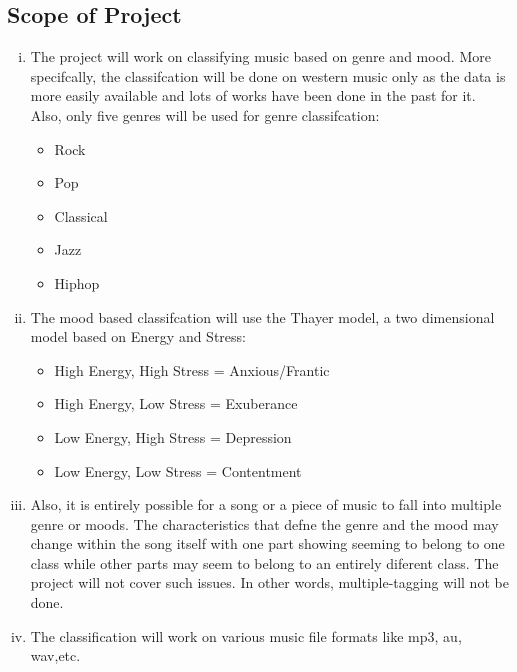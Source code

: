\subsection{Scope of Project}
\begin{enumerate}[(i)]
        \item The project will work on classifying music based on genre and mood. More specifcally, the classifcation will be done on western music only as the data
                is more easily available and lots of works have been done in the past for it. Also, only five genres will be used for genre classifcation:
                \begin{itemize}
                        \item Rock
                        \item Pop
                        \item Classical
                        \item Jazz
                        \item Hiphop
                \end{itemize}

        \item The mood based classifcation will use the Thayer model, a two dimensional model based on Energy and Stress:

                \begin{itemize}
                        \item High Energy, High Stress = Anxious/Frantic

                        \item High Energy, Low Stress = Exuberance

                        \item Low Energy, High Stress = Depression

                        \item Low Energy, Low Stress = Contentment
                \end{itemize}

        \item Also, it is entirely possible for a song or a piece of music to fall into multiple genre or moods. The characteristics that defne the genre
                and the mood may change within the song itself with one part showing seeming to belong to one class while other parts may seem to belong to
                an entirely diferent class. The project will not cover such issues. In other words, multiple-tagging will not be done.

        \item The classification will work on various music file formats like mp3, au, wav,etc.

\end{enumerate}

